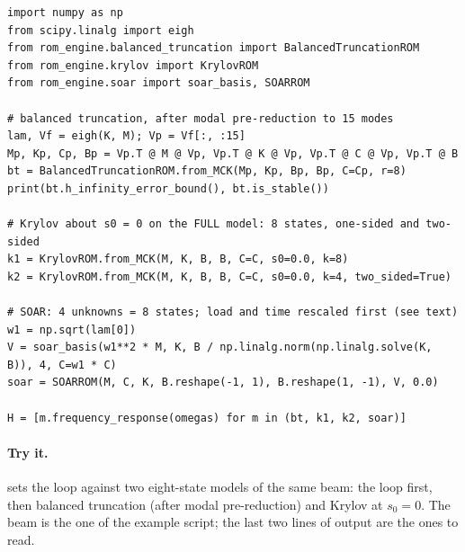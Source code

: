 \begin{lstlisting}[caption={The three reductions on one collocated port; M, K, C are the free-dof matrices and B the tip load vector.},label={lst:bt-run}]
import numpy as np
from scipy.linalg import eigh
from rom_engine.balanced_truncation import BalancedTruncationROM
from rom_engine.krylov import KrylovROM
from rom_engine.soar import soar_basis, SOARROM

# balanced truncation, after modal pre-reduction to 15 modes
lam, Vf = eigh(K, M); Vp = Vf[:, :15]
Mp, Kp, Cp, Bp = Vp.T @ M @ Vp, Vp.T @ K @ Vp, Vp.T @ C @ Vp, Vp.T @ B
bt = BalancedTruncationROM.from_MCK(Mp, Kp, Bp, Bp, C=Cp, r=8)
print(bt.h_infinity_error_bound(), bt.is_stable())

# Krylov about s0 = 0 on the FULL model: 8 states, one-sided and two-sided
k1 = KrylovROM.from_MCK(M, K, B, B, C=C, s0=0.0, k=8)
k2 = KrylovROM.from_MCK(M, K, B, B, C=C, s0=0.0, k=4, two_sided=True)

# SOAR: 4 unknowns = 8 states; load and time rescaled first (see text)
w1 = np.sqrt(lam[0])
V = soar_basis(w1**2 * M, K, B / np.linalg.norm(np.linalg.solve(K, B)), 4, C=w1 * C)
soar = SOARROM(M, C, K, B.reshape(-1, 1), B.reshape(1, -1), V, 0.0)

H = [m.frequency_response(omegas) for m in (bt, k1, k2, soar)]
\end{lstlisting}

\paragraph{Try it.}  sets the loop against two eight-state models of the same beam: the loop first, then balanced truncation (after modal pre-reduction) and Krylov at $s_0=0$. The beam is the one of the example script; the last two lines of output are the ones to read.

